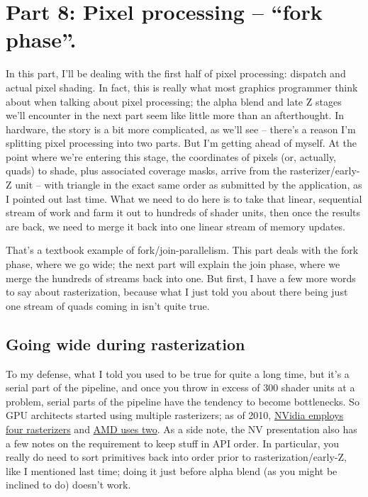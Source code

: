 \documentclass[12pt]{article}
\begin{document}
\section{Part 8: Pixel processing – “fork phase”.}
\label{sec:orge1c00eb}
\label{part8}

In this part, I’ll be dealing with the first half of pixel processing: dispatch and actual pixel shading. In fact, this is really what most graphics programmer think about when talking about pixel processing; the alpha blend and late Z stages we’ll encounter in the next part seem like little more than an afterthought. In hardware, the story is a bit more complicated, as we’ll see – there’s a reason I’m splitting pixel processing into two parts. But I’m getting ahead of myself. At the point where we’re entering this stage, the coordinates of pixels (or, actually, quads) to shade, plus associated coverage masks, arrive from the rasterizer/early-Z unit – with triangle in the exact same order as submitted by the application, as I pointed out last time. What we need to do here is to take that linear, sequential stream of work and farm it out to hundreds of shader units, then once the results are back, we need to merge it back into one linear stream of memory updates.

That’s a textbook example of fork/join-parallelism. This part deals with the fork phase, where we go wide; the next part will explain the join phase, where we merge the hundreds of streams back into one. But first, I have a few more words to say about rasterization, because what I just told you about there being just one stream of quads coming in isn’t quite true.

\subsection{Going wide during rasterization}
\label{sec:org5fa43c0}

To my defense, what I told you used to be true for quite a long time, but it’s a serial part of the pipeline, and once you throw in excess of 300 shader units at a problem, serial parts of the pipeline have the tendency to become bottlenecks. So GPU architects started using multiple rasterizers; as of 2010, \href{http://www.highperformancegraphics.org/previous/www\_2010/media/Hot3D/HPG2010\_Hot3D\_NVIDIA.pdf}{NVidia employs four rasterizers} and \href{http://www.highperformancegraphics.org/previous/www\_2010/media/Hot3D/HPG2010\_Hot3D\_AMD.pdf}{AMD uses two}. As a side note, the NV presentation also has a few notes on the requirement to keep stuff in API order. In particular, you really do need to sort primitives back into order prior to rasterization/early-Z, like I mentioned last time; doing it just before alpha blend (as you might be inclined to do) doesn’t work.
\end{document}
